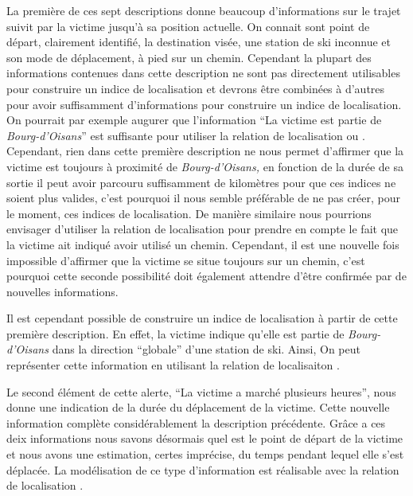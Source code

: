 La première de ces sept descriptions donne beaucoup d'informations sur
le trajet suivit par la victime jusqu'à sa position actuelle. On
connait sont point de départ, clairement identifié, la destination
visée, une station de ski inconnue et son mode de déplacement, à pied
sur un chemin. Cependant la plupart des informations contenues dans
cette description ne sont pas directement utilisables pour construire
un indice de localisation et devrons être combinées à d'autres pour
avoir suffisamment d'informations pour construire un indice de
localisation. On pourrait par exemple augurer que l'information
\enquote{La victime est partie de \emph{Bourg-d'Oisans}} est
suffisante pour utiliser la relation de localisation
 ou . Cependant,
rien dans cette première description ne nous permet d'affirmer que la
victime est toujours à proximité de \emph{Bourg-d'Oisans,} en fonction
de la durée de sa sortie il peut avoir parcouru suffisamment de
kilomètres pour que ces indices ne soient plus valides, c'est pourquoi
il nous semble préférable de ne pas créer, pour le moment, ces indices
de localisation. De manière similaire nous pourrions envisager
d'utiliser la relation de localisation
 pour
prendre en compte le fait que la victime ait indiqué avoir utilisé un
chemin. Cependant, il est une nouvelle fois impossible d'affirmer que
la victime se situe toujours sur un chemin, c'est pourquoi cette
seconde possibilité doit également attendre d'être confirmée par de
nouvelles informations.

Il est cependant possible de construire un indice de localisation à
partir de cette première description. En effet, la victime indique
qu'elle est partie de \emph{Bourg-d'Oisans} dans la direction
\enquote{globale} d'une station de ski. Ainsi, 
%
On peut représenter cette information en utilisant la relation de
localisaiton .



Le second élément de cette alerte, \enquote{La victime a marché
  plusieurs heures}, nous donne une indication de la durée du
déplacement de la victime. Cette nouvelle information complète
considérablement la description précédente.
%
Grâce a ces deix informations nous savons désormais quel est le point
de départ de la victime et nous avons une estimation, certes
imprécise, du temps pendant lequel elle s'est déplacée.
%
La modélisation de ce type d'information est réalisable avec la
relation de localisation .



